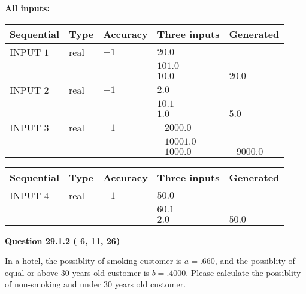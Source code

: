 \documentclass[12pt]{article}
\begin{document}
   
   
   
\noindent\vspace{0.1in}\hspace{-0.08in} {\textbf{\Large{All inputs: }}}
   
   
  
  
\noindent\begin{tabular}{|l|l|l|l|l|}
\hline
 Sequential & Type & Accuracy & Three inputs & Generated \\ 
\hline
 
 
  INPUT $           1$ & real & $          -1 $ & $
 20.0
  $ & \\
  & & &  $
 101.0
  $ & \\
  & & &  $
 10.0
 $ & $ 20.0 $ 
 \\  \hline  
 
 
  INPUT $           2$ & real & $          -1 $ & $
 2.0
  $ & \\
  & & &  $
 10.1
  $ & \\
  & & &  $
 1.0
 $ & $ 5.0 $ 
 \\  \hline  
 
 
  INPUT $           3$ & real & $          -1 $ & $
 -2000.0
  $ & \\
  & & &  $
 -10001.0
  $ & \\
  & & &  $
 -1000.0
 $ & $ -9000.0 $ 
 \\  \hline  
 \end{tabular}
   
   
  
  
\noindent\begin{tabular}{|l|l|l|l|l|}
\hline
 Sequential & Type & Accuracy & Three inputs & Generated \\ 
\hline
 
 
  INPUT $           4$ & real & $          -1 $ & $
 50.0
  $ & \\
  & & &  $
 60.1
  $ & \\
  & & &  $
 2.0
 $ & $ 50.0 $ 
 \\  \hline  
 \end{tabular}
   
   
  
\vspace{0.2in}
  
{\textbf{\Large{Question
29.1.2 
 (          6,         11,         26)
}}}
  
  
In a hotel, the possiblity of  %
smoking customer is
$a =  %
.660$, and the possiblity of  %
equal or above 30 years old customer is $ b =  %
.4000$.
Please calculate the possiblity of  %
 non-smoking and  %
under 30 years old customer.
 
\end{document}
